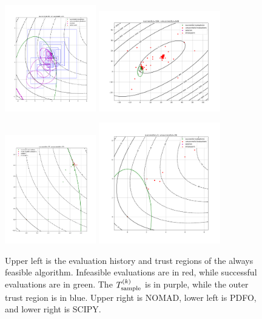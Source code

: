\begin{figure}[ht]
    \centering
    \includegraphics[width=150px]{images/12_always_feasible_no_params.png}
    \includegraphics[width=200px]{images/12_nomad_no_params.png}
    
    \includegraphics[width=150px]{images/12_pdfo_no_params.png}
    \includegraphics[width=200px]{images/12_scipy_no_params.png}
    \caption[Evaluation histories for problem 12.]{
    	Upper left is the evaluation history and trust regions of the always feasible algorithm.
    	Infeasible evaluations are in red, while successful evaluations are in green.
    	The ${T_{\text{sample}}^{(k)}}$ is in purple, while the outer trust region is in blue.
    	Upper right is NOMAD, lower left is PDFO, and lower right is SCIPY.
	}
    \label{example_history_plot}
\end{figure}

